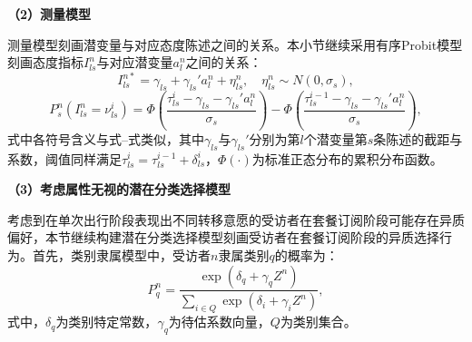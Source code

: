 \textbf{（2）测量模型}

测量模型刻画潜变量与对应态度陈述之间的关系。本小节继续采用有序Probit模型刻画态度指标$I_{ls}^{n}$与对应潜变量$a_l^n$之间的关系：
\begin{equation}
I_{ls}^{n*} = \gamma_{ls} + \gamma_{ls}' a_l^n + \eta_{ls}^n,\quad \eta_{ls}^n \sim N(0,\sigma_{s}),
\label{eq.staged.bundle.measure1}
\end{equation}
\begin{equation}
P_s^n(I_{ls}^{n}=\nu_{ls}^i) = \Phi\!\left(\frac{\tau_{ls}^i-\gamma_{ls}-\gamma_{ls}'a_l^n}{\sigma_{s}}\right) - \Phi\!\left(\frac{\tau_{ls}^{i-1}-\gamma_{ls}-\gamma_{ls}'a_l^n}{\sigma_{s}}\right),
\label{eq.staged.bundle.measure2}
\end{equation}
式中各符号含义与式--式类似，其中$\gamma_{ls}$与$\gamma_{ls}'$分别为第$l$个潜变量第$s$条陈述的截距与系数，阈值同样满足$\tau_{ls}^{i}=\tau_{ls}^{i-1}+\delta_{ls}^{i}$，$\Phi(\cdot)$为标准正态分布的累积分布函数。

\textbf{（3）考虑属性无视的潜在分类选择模型}

考虑到在单次出行阶段表现出不同转移意愿的受访者在套餐订阅阶段可能存在异质偏好，本节继续构建潜在分类选择模型刻画受访者在套餐订阅阶段的异质选择行为。首先，类别隶属模型中，受访者$n$隶属类别$q$的概率为：
\begin{equation}
P_q^n = \frac{\exp(\delta_q+\gamma_q Z^n)}{\sum_{i\in Q}\exp(\delta_i+\gamma_i Z^n)},
\label{eq.staged.bundle.membership}
\end{equation}
式中，$\delta_q$为类别特定常数，$\gamma_q$为待估系数向量，$Q$为类别集合。

